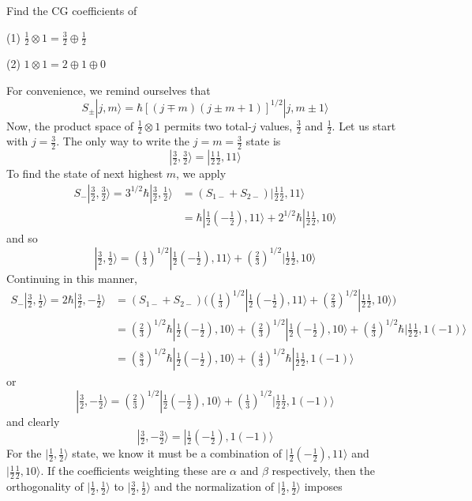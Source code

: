 \documentclass[../principles-of-quantum-mechanics.tex]{subfiles}
\begin{document}
\begin{questions}
		\question Find the CG coefficients of
		
		(1) $\tfrac{1}{2}\otimes 1 = \tfrac{3}{2}\oplus\tfrac{1}{2}$
		
		(2) $1\otimes 1 = 2\oplus 1 \oplus 0$
		
		\begin{solution}
			For convenience, we remind ourselves that
			$$S_\pm|j, m\rangle = \hbar[(j\mp m)(j\pm m + 1)]^{1/2}|j, m\pm 1\rangle$$
			Now, the product space of $\tfrac{1}{2}\otimes 1$ permits two total-$j$ values, $\tfrac{3}{2}$ and $\tfrac{1}{2}$. Let us start with $j = \tfrac{3}{2}$. The only way to write the $j = m = \tfrac{3}{2}$ state is
			$$|\tfrac{3}{2}, \tfrac{3}{2}\rangle = |\tfrac{1}{2}\tfrac{1}{2}, 11\rangle$$
			To find the state of next highest $m$, we apply
			\begin{align*}
				S_-|\tfrac{3}{2},\tfrac{3}{2}\rangle = 3^{1/2}\hbar|\tfrac{3}{2},\tfrac{1}{2}\rangle &= (S_{1-} + S_{2-})|\tfrac{1}{2}\tfrac{1}{2},11\rangle \\
				&= \hbar|\tfrac{1}{2}(-\tfrac{1}{2}), 11\rangle + 2^{1/2}\hbar|\tfrac{1}{2}\tfrac{1}{2},10\rangle
			\end{align*}
			and so
			$$|\tfrac{3}{2},\tfrac{1}{2}\rangle = (\tfrac{1}{3})^{1/2}|\tfrac{1}{2}(-\tfrac{1}{2}),11\rangle + (\tfrac{2}{3})^{1/2}|\tfrac{1}{2}\tfrac{1}{2},10\rangle$$
			Continuing in this manner,
			\begin{align*}
				S_-|\tfrac{3}{2},\tfrac{1}{2}\rangle = 2\hbar|\tfrac{3}{2},-\tfrac{1}{2}\rangle &= (S_{1-} + S_{2-})\Big((\tfrac{1}{3})^{1/2}|\tfrac{1}{2}(-\tfrac{1}{2}),11\rangle + (\tfrac{2}{3})^{1/2}|\tfrac{1}{2}\tfrac{1}{2},10\rangle\Big) \\
				&= (\tfrac{2}{3})^{1/2}\hbar|\tfrac{1}{2}(-\tfrac{1}{2}),10\rangle + (\tfrac{2}{3})^{1/2}|\tfrac{1}{2}(-\tfrac{1}{2}),10\rangle + (\tfrac{4}{3})^{1/2}\hbar|\tfrac{1}{2}\tfrac{1}{2},1({-1})\rangle \\
				&= (\tfrac{8}{3})^{1/2}\hbar|\tfrac{1}{2}(-\tfrac{1}{2}),10\rangle + (\tfrac{4}{3})^{1/2}\hbar|\tfrac{1}{2}\tfrac{1}{2},1(-1)\rangle
			\end{align*}
			or
			$$|\tfrac{3}{2},{-\tfrac{1}{2}}\rangle = (\tfrac{2}{3})^{1/2}|\tfrac{1}{2}(-\tfrac{1}{2}),10\rangle + (\tfrac{1}{3})^{1/2}|\tfrac{1}{2}\tfrac{1}{2},1(-1)\rangle$$
			and clearly
			$$|\tfrac{3}{2},{-\tfrac{3}{2}}\rangle = |\tfrac{1}{2}(-\tfrac{1}{2}),1(-1)\rangle$$
			For the $|\tfrac{1}{2},\tfrac{1}{2}\rangle$ state, we know it must be a combination of $|\tfrac{1}{2}(-\tfrac{1}{2}), 11\rangle$ and $|\tfrac{1}{2}\tfrac{1}{2}, 10\rangle$. If the coefficients weighting these are $\alpha$ and $\beta$ respectively, then the orthogonality of $|\tfrac{1}{2},\tfrac{1}{2}\rangle$ to $|\tfrac{3}{2},\tfrac{1}{2}\rangle$ and the normalization of $|\tfrac{1}{2},\tfrac{1}{2}\rangle$ imposes

\end{solution}
\end{questions}
\end{document}
